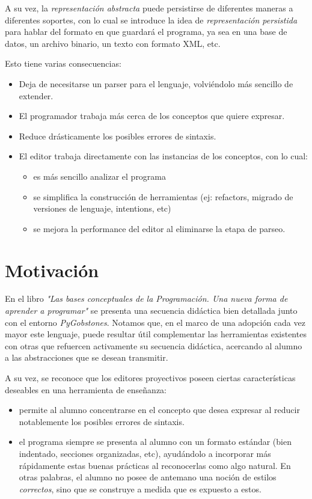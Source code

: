 A su vez, la \textit{representación abstracta} puede persistirse de diferentes maneras a diferentes soportes, con lo cual se introduce la idea de \textit{representación persistida} para hablar del formato en que guardará el programa, ya sea en una base de datos, un archivo binario, un texto con formato XML, etc.


Esto tiene varias consecuencias:
\begin{itemize}
  \item Deja de necesitarse un parser para el lenguaje, volviéndolo más sencillo de extender.
  \item El programador trabaja más cerca de los conceptos que quiere expresar.
  \item Reduce drásticamente los posibles errores de sintaxis.
  \item El editor trabaja directamente con las instancias de los conceptos, con lo cual:
  \begin{itemize}
    \item es más sencillo analizar el programa
    \item se simplifica la construcción de herramientas (ej: refactors, migrado de versiones de lenguaje, intentions, etc)
    \item se mejora la performance del editor al eliminarse la etapa de parseo.
  \end{itemize}
\end{itemize}


\section{Motivación}

En el libro \textit{"Las bases conceptuales de la Programación. Una nueva forma de aprender a programar"}\cite{Gobstones} se presenta una secuencia didáctica bien detallada junto con el entorno \textit{PyGobstones}\cite{PyGobstones}. Notamos que, en el marco de una adopción cada vez mayor este lenguaje, puede resultar útil complementar las herramientas existentes con otras que refuercen activamente su secuencia didáctica, acercando al alumno a las abstracciones que se desean transmitir.

A su vez, se reconoce que los editores proyectivos poseen ciertas características deseables en una herramienta de enseñanza:

\begin{itemize}
  \item permite al alumno concentrarse en el concepto que desea expresar al reducir notablemente los posibles errores de sintaxis.
  \item el programa siempre se presenta al alumno con un formato estándar (bien indentado, secciones organizadas, etc), ayudándolo a incorporar más rápidamente estas buenas prácticas al reconocerlas como algo natural. En otras palabras, el alumno no posee de antemano una noción de estilos \textit{correctos}, sino que se construye a medida que es expuesto a estos.
\end{itemize}


